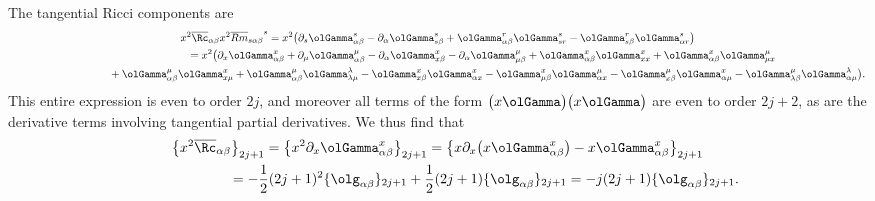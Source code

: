 The tangential Ricci components are
\begin{gather*}
x^2 \overline{\Rc}_{\alpha \beta} x^2 {\overline{Rm}_{s \alpha \beta}}^{s}
= x^2 \big( \partial_s \olGamma_{\alpha \beta}^s - \partial_{\alpha} \olGamma_{s \beta}^s + \olGamma_{\alpha \beta}^r \olGamma_{sr}^s - \olGamma_{s \beta}^r \olGamma_{\alpha r}^s \big) \nonumber\\
\hphantom{x^2 \overline{\Rc}_{\alpha \beta} x^2 {\overline{Rm}_{s \alpha \beta}}^{s} }{} = x^2 \big( \partial_x \olGamma_{\alpha \beta}^x + \partial_{\mu} \olGamma_{\alpha \beta}^{\mu} - \partial_{\alpha} \olGamma_{x \beta}^x - \partial_{\alpha} \olGamma_{\mu \beta}^{\mu}
+ \olGamma_{\alpha \beta}^x \olGamma_{xx}^x + \olGamma_{\alpha \beta}^x \olGamma_{\mu x}^{\mu} \nonumber\\
\hphantom{x^2 \overline{\Rc}_{\alpha \beta} x^2 {\overline{Rm}_{s \alpha \beta}}^{s} =}{} + \olGamma_{\alpha \beta}^{\mu} \olGamma_{x\mu}^x + \olGamma_{\alpha \beta}^{\mu} \olGamma_{\lambda \mu}^{\lambda} - \olGamma_{x \beta}^x \olGamma_{\alpha x}^x - \olGamma_{\mu \beta}^x \olGamma_{\alpha x}^{\mu} - \olGamma_{x \beta}^{\mu} \olGamma_{\alpha \mu}^x - \olGamma_{\lambda \beta}^{\mu} \olGamma_{\alpha \mu}^{\lambda} \big).%
\end{gather*}
This entire expression is even to order $2j$, and moreover all terms of the form $\big(x \olGamma\big)\big(x \olGamma\big)$ are even to order $2j+2$, as are the derivative terms involving tangential partial derivatives. We thus find that
\begin{gather}
\big\{ x^2 \overline{\Rc}_{\alpha \beta} \big\}_{2j+1} = \big\{ x^2 \partial_x \olGamma_{\alpha \beta}^x \big\}_{2j+1}
=\big\{ x \partial_x \big( x \olGamma_{\alpha \beta}^x\big) - x \olGamma_{\alpha \beta}^x \big\}_{2j+1}\label{eqA.7}\\
\hphantom{\big\{ x^2 \overline{\Rc}_{\alpha \beta} \big\}_{2j+1}}{}= -\frac{1}{2} (2j+1)^2 \{\olg_{\alpha \beta}\}_{2j+1} + \frac{1}{2} (2j+1) \{\olg_{\alpha \beta}\}_{2j+1}
 = - j (2j+1)\{\olg_{\alpha \beta}\}_{2j+1} .\nonumber
\end{gather}

